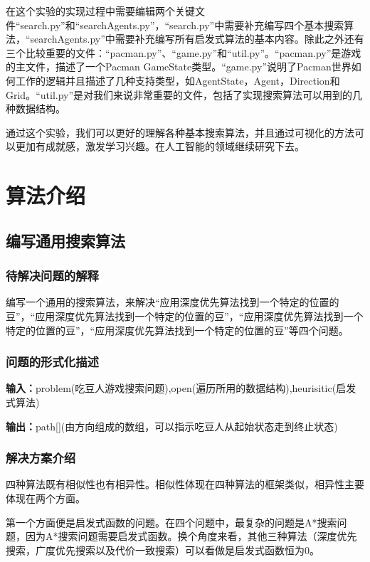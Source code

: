 \documentclass[forprint]{WHUBachelor}
\begin{document}
在这个实验的实现过程中需要编辑两个关键文件“search.py”和“searchAgents.py”，“search.py”中需要补充编写四个基本搜索算法，“searchAgents.py”中需要补充编写所有启发式算法的基本内容。除此之外还有三个比较重要的文件：“pacman.py”、“game.py”和“util.py”。“pacman.py”是游戏的主文件，描述了一个Pacman GameState类型。“game.py”说明了Pacman世界如何工作的逻辑并且描述了几种支持类型，如AgentState，Agent，Direction和Grid。“util.py”是对我们来说非常重要的文件，包括了实现搜索算法可以用到的几种数据结构。

通过这个实验，我们可以更好的理解各种基本搜索算法，并且通过可视化的方法可以更加有成就感，激发学习兴趣。在人工智能的领域继续研究下去。

\chapter{算法介绍}

\section{编写通用搜索算法}

\subsection{待解决问题的解释}

编写一个通用的搜索算法，来解决“应用深度优先算法找到一个特定的位置的豆”，“应用深度优先算法找到一个特定的位置的豆”，“应用深度优先算法找到一个特定的位置的豆”，“应用深度优先算法找到一个特定的位置的豆”等四个问题。

\subsection{问题的形式化描述}

\textbf{输入：}problem(吃豆人游戏搜索问题),open(遍历所用的数据结构),heurisitic(启发式算法)

\textbf{输出：}path[](由方向组成的数组，可以指示吃豆人从起始状态走到终止状态)

\subsection{解决方案介绍}

四种算法既有相似性也有相异性。相似性体现在四种算法的框架类似，相异性主要体现在两个方面。

第一个方面便是启发式函数的问题。在四个问题中，最复杂的问题是A*搜索问题，因为A*搜索问题需要启发式函数。换个角度来看，其他三种算法（深度优先搜索，广度优先搜索以及代价一致搜索）可以看做是启发式函数恒为0。
\end{document}
